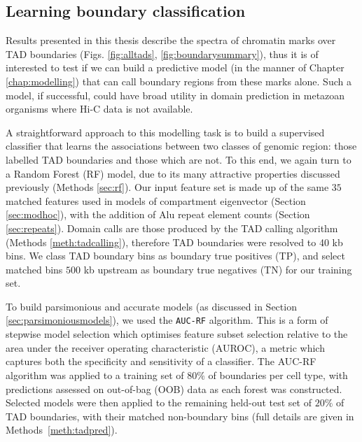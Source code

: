 \documentclass[a4paper,11pt,oneside]{book}
\begin{document}

\subsection{Learning boundary classification}\label{sec:tadpred}

Results presented in this thesis describe the spectra of chromatin marks over TAD boundaries (Figs. \ref{fig:alltads}, \ref{fig:boundarysummary}), thus it is of interested to test if we can build a predictive model (in the manner of Chapter \ref{chap:modelling}) that can call boundary regions from these marks alone. Such a model, if successful, could have broad utility in domain prediction in metazoan organisms where Hi-C data is not available.

A straightforward approach to this modelling task is to build a supervised classifier that learns the associations between two classes of genomic region: those labelled TAD boundaries and those which are not. To this end, we again turn to a Random Forest (RF) model, due to its many attractive properties discussed previously (Methods \ref{sec:rf}). Our input feature set is made up of the same $35$ matched features used in models of compartment eigenvector (Section \ref{sec:modhoc}), with the addition of Alu repeat element counts (Section \ref{sec:repeats}). Domain calls are those produced by the \citet{Dixon2012} TAD calling algorithm (Methods \ref{meth:tadcalling}), therefore TAD boundaries were resolved to 40 kb bins. We class TAD boundary bins as boundary true positives (TP), and select matched bins $500$ kb upstream as boundary true negatives (TN) for our training set.

To build parsimonious and accurate models (as discussed in Section \ref{sec:parsimoniousmodels}), we used the \texttt{AUC-RF} algorithm.\cite{Calle2011} This is a form of stepwise model selection which optimises feature subset selection relative to the area under the receiver operating characteristic (AUROC), a metric which captures both the specificity and sensitivity of a classifier. The AUC-RF algorithm was applied to a training set of $80\%$ of boundaries per cell type, with predictions assessed on out-of-bag (OOB) data as each forest was constructed. Selected models were then applied to the remaining held-out test set of $20\%$ of TAD boundaries, with their matched non-boundary bins (full details are given in Methods~\ref{meth:tadpred}). 
\end{document}
